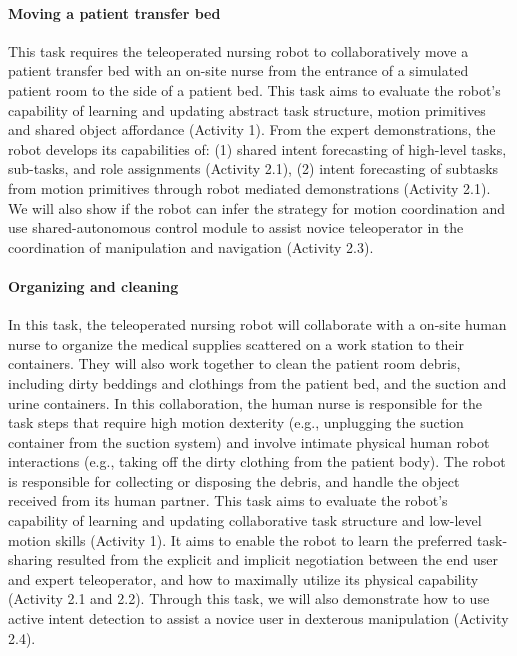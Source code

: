 \documentclass[letterpaper, 11 pt, onecolumn]{article}
\begin{document}
\paragraph*{Moving a patient transfer bed} This task requires the teleoperated nursing robot to collaboratively move a patient transfer bed with an on-site nurse from the entrance of a simulated patient room to the side of a patient bed. This task aims to evaluate the robot's capability of learning and updating abstract task structure, motion primitives and shared object affordance (Activity 1). From the expert demonstrations, the robot develops its capabilities of: (1) shared intent forecasting of high-level tasks, sub-tasks, and role assignments (Activity 2.1), (2) intent forecasting of subtasks from motion primitives through robot mediated demonstrations (Activity 2.1). We will also show if the robot can infer the strategy for motion coordination and use shared-autonomous control module to assist novice teleoperator in the coordination of manipulation and navigation (Activity 2.3). 

\paragraph*{Organizing and cleaning} In this task, the teleoperated nursing robot will collaborate with a on-site human nurse to organize the medical supplies scattered on a work station to their containers. They will also work together to clean the patient room debris, including dirty beddings and clothings from the patient bed, and the suction and urine containers. In this collaboration, the human nurse is responsible for the task steps that require high motion dexterity (e.g., unplugging the suction container from the suction system) and involve intimate physical human robot interactions (e.g., taking off the dirty clothing from the patient body). The robot is responsible for collecting or disposing the debris, and handle the object received from its human partner. This task aims to evaluate the robot's capability of learning and updating collaborative task structure and low-level motion skills (Activity 1). It aims to enable the robot to learn the preferred task-sharing resulted from the explicit and implicit negotiation between the end user and expert teleoperator, and how to maximally utilize its physical capability (Activity 2.1 and 2.2). Through this task, we will also demonstrate how to use active intent detection to assist a novice user in dexterous manipulation (Activity 2.4).  
\end{document}
